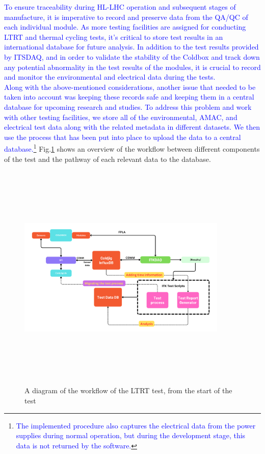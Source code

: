 \textcolor{blue}{To ensure traceability during HL-LHC operation and subsequent stages of manufacture, it is imperative to record and preserve data from the QA/QC of each individual module. As more testing facilities are assigned for conducting LTRT and thermal cycling tests, it's critical to store test results in an international database for future analysis. In addition to the test results provided by ITSDAQ, and in order to validate the stability of the Coldbox and track down any potential abnormality in the test results of the modules, it is crucial to record and monitor the environmental and electrical data during the tests.} \\

\textcolor{blue}{Along with the above-mentioned considerations, another issue that needed to be taken into account was keeping these records safe and keeping them in a central database for upcoming research and studies. To address this problem and work with other testing facilities, we store all of the environmental, AMAC, and electrical test data along with the related metadata in different datasets. We then use the process that has been put into place to upload the data to a central database.}\footnote{\textcolor{blue}{The implemented procedure also captures the electrical data from the power supplies during normal operation, but during the development stage, this data is not returned by the software.}} Fig.\ref{fig:testworkflow} shows an overview of the workflow between different components of the test and the pathway of each relevant data to the database. 

\begin{figure}[h]
    \centering
    \includegraphics[width=10cm,height=11cm,keepaspectratio]{Figures/test/test diagram2.png}
    \caption{A diagram of the workflow of the LTRT test, from the start of the test}
    \label{fig:testworkflow}
\end{figure}

